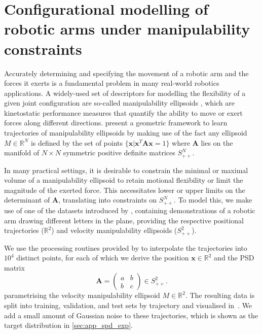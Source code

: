 \section{Configurational modelling of robotic arms under manipulability constraints}
\label{sec:robotic_arm}

Accurately determining and specifying the movement of a robotic arm and the forces it exerts is a fundamental problem in many real-world robotics applications.
A widely-used set of descriptors for modelling the flexibility of a given joint configuration are so-called manipulability ellipsoids \parencite{yoshikawa1985manipulability}, which are kinetostatic performance measures that quantify the ability to move or exert forces along different directions.
\textcite{jaquier2021geometry} present a geometric framework to learn trajectories of manipulability ellipsoids by making use of the fact any ellipsoid $M\in\mathbb{R}^N$ is defined by the set of points $\{\mathbf{x}\vert\mathbf{x}^T\mathbf{A}\mathbf{x}=1\}$ where $\mathbf{A}$ lies on the manifold of $N\times N$ symmetric positive definite matrices $S^N_{++}$.

In many practical settings, it is desirable to constrain the minimal or maximal volume of a manipulability ellipsoid to retain motional flexibility or limit the magnitude of the exerted force.
This necessitates lower or upper limits on the determinant of $\textbf{A}$, translating into constraints on $S^N_{++}$.
To model this, we make use of one of the datasets introduced by \textcite{jaquier2021geometry}, containing demonstrations of a robotic arm drawing different letters in the plane, providing the respective positional trajectories ($\mathbb{R}^2$) and velocity manipulability ellipsoids ($S^2_{++}$).

We use the processing routines provided by \textcite{jaquier2021geometry} to interpolate the trajectories into $10^4$ distinct points, for each of which we derive the position $\mathbf{x}\in\mathbb{R}^2$ and the PSD matrix $$ \mathbf{A}=\begin{pmatrix} a & b \\ b & c \end{pmatrix}\in S^2_{++}.
$$
parametrising the velocity manipulability ellipsoid $M\in\mathbb{R}^2$.
The resulting data is split into training, validation, and test sets by trajectory and visualised in~.
We add a small amount of Gaussian noise to these trajectories, which is shown as the target distribution in \ref{sec:app_spd_exp}.

